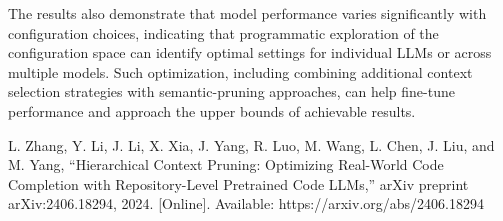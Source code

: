 \documentclass[conference]{IEEEtran}
\begin{document}
The results also demonstrate that model performance varies significantly with configuration choices, 
indicating that programmatic exploration of the configuration space can identify optimal settings for 
individual LLMs or across multiple models. Such optimization, including combining additional context selection strategies 
with semantic-pruning approaches, 
can help fine-tune performance and approach the upper bounds of achievable results.


\begin{thebibliography}{00}
 L. Zhang, Y. Li, J. Li, X. Xia, J. Yang, R. Luo, M. Wang, L. Chen, J. Liu, and M. Yang, ``Hierarchical Context Pruning: Optimizing Real-World Code Completion with Repository-Level Pretrained Code LLMs,'' arXiv preprint arXiv:2406.18294, 2024. [Online]. Available: https://arxiv.org/abs/2406.18294
\end{thebibliography}
\vspace{12pt}
\end{document}
